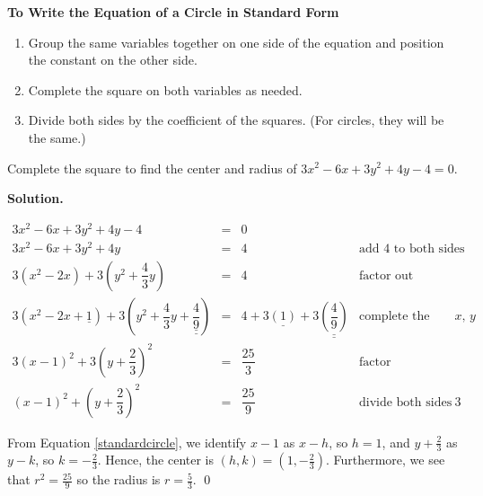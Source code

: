 \smallskip

\colorbox{ResultColor}{\bbm

\centerline{\textbf{To Write the Equation of a Circle in Standard Form}}

\begin{enumerate}

\item  Group the same variables together on one side of the equation and position the constant on the other side.

\item  Complete the square on both variables as needed.

\item  Divide both sides by the coefficient of the squares. (For circles, they will be the same.)

\end{enumerate}

\ebm}

\smallskip

\begin{ex} \label{ctscircleex} Complete the square to find the center and radius of $3x^2 - 6x + 3y^2 + 4y -4 = 0$.

\smallskip

{\bf Solution.}

 \[ \begin{array}{rclr} 3x^2 - 6x + 3y^2 + 4y -4 & = & 0 & \\ 
 3x^2 - 6x + 3y^2 + 4y & = & 4 & \mbox{add $4$ to both sides} \\ [3pt]
 3\left(x^2 - 2x \right) + 3\left(y^2 + \dfrac{4}{3} y\right) & = & 4 & \mbox{factor out leading coefficients} \\ [10pt]
 3\left(x^2 - 2x + \underline{1} \right) + 3\left(y^2 + \dfrac{4}{3} y + \underline{\underline{\dfrac{4}{9}}} \right) & = & 4 + 3\underline{(1)} + 3\underline{\underline{\left(\dfrac{4}{9}\right)}} &  \mbox{complete the square in $x$, $y$} \\  [10pt]
 3(x - 1)^2 + 3\left(y + \dfrac{2}{3}\right)^2 & = & \dfrac{25}{3} & \mbox{factor} \\ [10pt]
 (x - 1)^2 + \left(y + \dfrac{2}{3}\right)^2 & = & \dfrac{25}{9} & \mbox{divide both sides by $3$}\end{array} \]
 
From Equation \ref{standardcircle}, we identify $x - 1$ as $x - h$, so $h = 1$, and $y + \frac{2}{3}$ as $y - k$, so $k =  - \frac{2}{3}$.  Hence, the center is $(h,k) = \left(1, -\frac{2}{3}\right)$.   Furthermore, we see that $r^2 = \frac{25}{9}$ so the radius is $r = \frac{5}{3}$.  \qed

\end{ex}

